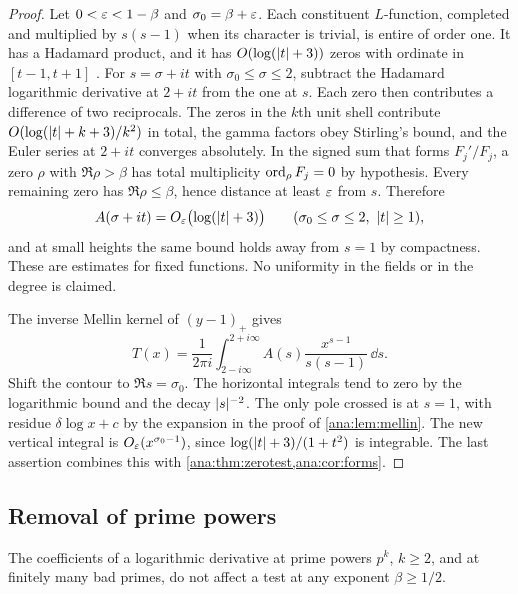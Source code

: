 \begin{proof}
Let $0<\varepsilon<1-\beta$ and $\sigma_0=\beta+\varepsilon$. Each constituent $L$-function, completed and
multiplied by $s(s-1)$ when its character is trivial, is entire of order one. It has a Hadamard
product, and it has $O(\log(\lvert t\rvert+3))$ zeros with ordinate in $[t-1,t+1]$
\cite[Ch.~5]{IwaniecKowalski2004Analytic}. For $s=\sigma+it$ with $\sigma_0\le\sigma\le2$,
subtract the Hadamard logarithmic derivative at $2+it$ from the one at $s$. Each zero then
contributes a difference of two reciprocals. The zeros in the $k$th unit shell contribute
$O(\log(\lvert t\rvert+k+3)/k^2)$ in total, the gamma factors obey Stirling's bound, and the Euler series
at $2+it$ converges absolutely. In the signed sum that forms $F_j'/F_j$, a zero $\rho$ with
$\Re\rho>\beta$ has total multiplicity $\operatorname{ord}_\rho F_j=0$ by hypothesis. Every remaining zero
has $\Re\rho\le\beta$, hence distance at least $\varepsilon$ from $s$. Therefore
\[
 A(\sigma+it)=O_\varepsilon\bigl(\log(\lvert t\rvert+3)\bigr)\qquad(\sigma_0\le\sigma\le2,\ \lvert t\rvert\ge1),
\]
and at small heights the same bound holds away from $s=1$ by compactness. These are estimates
for fixed functions. No uniformity in the fields or in the degree is claimed.

The inverse Mellin kernel of $(y-1)_+$ gives
\[
 T(x)=\frac1{2\pi i}\int_{2-i\infty}^{2+i\infty}A(s)\frac{x^{s-1}}{s(s-1)}\,\dd s .
\]
Shift the contour to $\Re s=\sigma_0$. The horizontal integrals tend to zero by the logarithmic
bound and the decay $\lvert s\rvert^{-2}$. The only pole crossed is at $s=1$, with residue
$\delta\log x+c$ by the expansion in the proof of \cref{ana:lem:mellin}. The new vertical
integral is $O_\varepsilon(x^{\sigma_0-1})$, since $\log(\lvert t\rvert+3)/(1+t^2)$ is integrable. The last
assertion combines this with \cref{ana:thm:zerotest,ana:cor:forms}.
\end{proof}

\subsection{Removal of prime powers}\label{ana:sec:primeonly}
{\raggedright{}}

The coefficients of a logarithmic derivative at prime powers $p^k$, $k\ge2$, and at finitely
many bad primes, do not affect a test at any exponent $\beta\ge1/2$.


